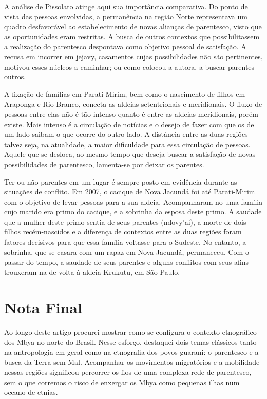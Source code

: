 A análise de Pissolato atinge aqui sua importância comparativa. Do ponto
de vista das pessoas envolvidas, a permanência na região Norte
representava um quadro desfavorável ao estabelecimento de novas
alianças de parentesco, visto que as oportunidades eram restritas. A
busca de outros contextos que possibilitassem a realização do
parentesco despontava como objetivo pessoal de satisfação. A recusa em
incorrer em jejavy, casamentos cujas possibilidades não são
pertinentes, motivou esses núcleos a caminhar; ou como colocou a
autora, a buscar parentes outros. 

A fixação de famílias em Parati-Mirim, bem como o nascimento de filhos
em Araponga e Rio Branco, conecta as aldeias setentrionais e
meridionais. O fluxo de pessoas entre elas não é tão intenso quanto é
entre as aldeias meridionais, porém existe. Mais intenso é a circulação
de notícias e o desejo de fazer com que os de um lado saibam o que
ocorre do outro lado. A distância entre as duas regiões talvez seja, na
atualidade, a maior dificuldade para essa circulação de pessoas. Aquele
que se desloca, ao mesmo tempo que deseja buscar a satisfação de novas
possibilidades de parentesco, lamenta-se por deixar os parentes. 

Ter ou não parentes em um lugar é sempre posto em evidência durante as
situações de conflito. Em 2007, o cacique de Nova Jacundá foi até
Parati-Mirim com o objetivo de levar pessoas para a sua aldeia.
Acompanharam-no uma família cujo marido era primo do cacique, e a
sobrinha da esposa deste primo. A saudade que a mulher deste primo
sentia de seus parentes (ndovy’ai), a morte de dois filhos
recém-nascidos e a diferença de contextos entre as duas regiões foram
fatores decisivos para que essa família voltasse para o Sudeste. No
entanto, a sobrinha, que se casara com um rapaz em Nova Jacundá,
permaneceu. Com o passar do tempo, a saudade de seus parentes e alguns
conflitos com seus afins trouxeram-na de volta à aldeia Krukutu, em São
Paulo.

\section{Nota Final}

Ao longo deste artigo procurei mostrar como se configura o contexto
etnográfico dos Mbya no norte do Brasil. Nesse esforço, destaquei dois
temas clássicos tanto na antropologia em geral como na etnografia dos
povos guarani: o parentesco e a busca da Terra sem Mal. Acompanhar os
movimentos migratórios e a mobilidade nessas regiões significou
percorrer os fios de uma complexa rede de parentesco, sem o que
corremos o risco de enxergar os Mbya como pequenas ilhas num oceano de
etnias.

